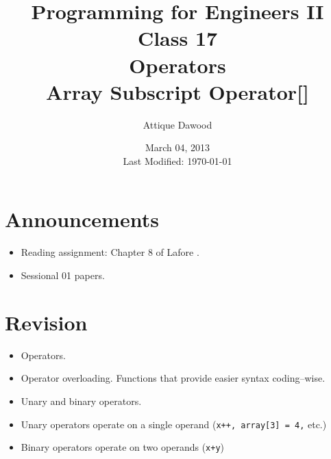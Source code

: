 \documentclass[12pt,a4paper]{article}
\date{March 04, 2013\\[0.2cm] Last Modified: \today}
\title{\vspace{-2cm}Programming for Engineers II\\Class 17\\Operators\\Array Subscript Operator[]}
\author{Attique Dawood}
\begin{document}
\maketitle
\section{Announcements}
\begin{itemize}
\item Reading assignment: Chapter 8 of Lafore \cite{Lafore}.
\item Sessional 01 papers.
\end{itemize}
\section{Revision}
\begin{itemize}
\item Operators.
\item Operator overloading. Functions that provide easier syntax coding--wise.
\item Unary and binary operators.
\item Unary operators operate on a single operand (\verb|x++, array[3] = 4,| etc.)
\item Binary operators operate on two operands (\verb|x+y|)
\end{itemize}
\end{document}
